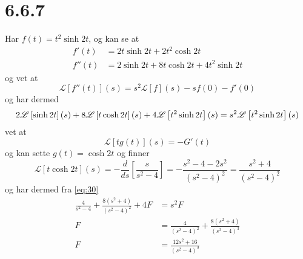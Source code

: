 \documentclass{report}
\newcommand{\nbrack}[1]{\left( #1 \right)}
\newcommand{\bbrack}[1]{\left[ #1 \right]}
\newcommand{\Lplc}[1]{\mathscr{L}\bbrack{ #1 } (s)}
\begin{document}
\section*{6.6.7}
Har $f(t) = t^{2}\sinh 2t$, og kan se at
\begin{equation}
  \label{eq:28}
  \begin{split}
    f'(t) &= 2t\sinh 2t + 2t^{2}\cosh 2t \\
    f''(t) &= 2\sinh 2t + 8t\cosh 2t + 4t^{2}\sinh 2t
  \end{split}
\end{equation}
og vet at
\begin{equation}
  \label{eq:29}
  \Lplc{f''(t)} = s^{2} \Lplc{f} - sf(0) - f'(0)
\end{equation}
og har dermed
\begin{equation}
  \label{eq:30}
  2\Lplc{\sinh 2t} + 8\Lplc{t\cosh 2t} + 4\Lplc{t^{2} \sinh 2t } = s^{2} \Lplc{t^{2}\sinh 2t} \\
\end{equation}
vet at
\begin{equation}
  \label{eq:32}
  \Lplc{tg(t)} = -G'(t)
\end{equation}
og kan sette $g(t) = \cosh 2t$ og finner
\begin{equation}
  \label{eq:33}
  \Lplc{t\cosh 2t} = -\frac{d}{ds} \bbrack{ \frac{s}{s^{2} - 4} } = -\frac{ s^{2} - 4 - 2s^{2} }{\nbrack{s^{2} - 4}^{2}} = \frac{s^{2} + 4}{\nbrack{s^{2}-4}^{2}}
\end{equation}
og har dermed fra \eqref{eq:30}
\begin{equation}
  \label{eq:34}
  \begin{split}
    \frac{4}{s^{2} - 4} + \frac{8\nbrack{s^{2} + 4}}{\nbrack{s^{2} - 4}^{2}} + 4F &= s^{2}F \\
    F &= \frac{4}{\nbrack{s^{2}-4}^{2}} + \frac{8\nbrack{s^{2} + 4}}{\nbrack{s^{2} - 4}^{3}} \\
    F &= \frac{12s^{2} + 16}{\nbrack{s^{2} - 4}^{3}}
  \end{split}
\end{equation}
\end{document}
